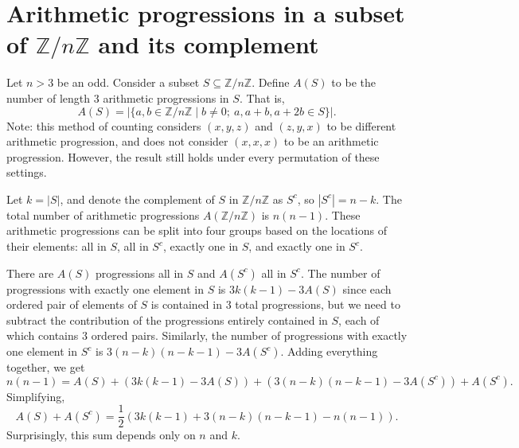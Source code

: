 \documentclass{article}
\newcommand{\p}[1]{\left(#1\right)}
\newcommand{\f}[2]{\frac{#1}{#2}}
\newcommand{\abs}[1]{\left\lvert#1\right\rvert}
\newcommand{\Z}{\mathbb{Z}}
\begin{document}
	\section*{Arithmetic progressions in a subset of $\Z/n\Z$ and its complement}

	Let $n > 3$ be an odd. Consider a subset $S \subseteq \Z/n\Z$. Define $A(S)$ to be the number of length 3 arithmetic progressions in $S$. That is,
	\[ A(S) = \abs{\{a, b \in \Z/n\Z \mid b \neq 0;\ a, a + b, a + 2b \in S \}}. \]
	Note: this method of counting considers $(x, y, z)$ and $(z, y, x)$ to be different arithmetic progression, and does not consider $(x, x, x)$ to be an arithmetic progression. However, the result still holds under every permutation of these settings.

	Let $k = \abs{S}$, and denote the complement of $S$ in $\Z/n\Z$ as $S^c$, so $\abs{S^c} = n - k$. The total number of arithmetic progressions $A(\Z/n\Z)$ is $n(n-1)$. These arithmetic progressions can be split into four groups based on the locations of their elements: all in $S$, all in $S^c$, exactly one in $S$, and exactly one in $S^c$.

	There are $A(S)$ progressions all in $S$ and $A(S^c)$ all in $S^c$. The number of progressions with exactly one element in $S$ is $3k(k-1) - 3A(S)$ since each ordered pair of elements of $S$ is contained in $3$ total progressions, but we need to subtract the contribution of the progressions entirely contained in $S$, each of which contains $3$ ordered pairs. Similarly, the number of progressions with exactly one element in $S^c$ is $3(n-k)(n-k-1) - 3A(S^c)$. Adding everything together, we get
	\[ n(n-1) = A(S) + (3k(k-1) - 3A(S)) + (3(n-k)(n-k-1) - 3A(S^c)) + A(S^c). \]
	Simplifying,
	\[ A(S) + A(S^c) = \f{1}{2}\p{3k(k-1) + 3(n-k)(n-k-1) - n(n-1)}. \]
	Surprisingly, this sum depends only on $n$ and $k$.
\end{document}
